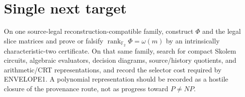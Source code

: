 \documentclass[11pt]{article}
\begin{document}
\section*{Single next target}
On one source-legal reconstruction-compatible family, construct \(\Phi\) and the legal slice
matrices and prove or falsify \(\operatorname{rank}_{\mathbb F_2}\Phi=\omega(m)\) by an
intrinsically characteristic-two certificate. On that same family, search for compact Skolem
circuits, algebraic evaluators, decision diagrams, source/history quotients, and
arithmetic/CRT representations, and record the selector cost required by ENVELOPE1. A
polynomial representation should be recorded as a hostile closure of the provenance route,
not as progress toward \(P\neq NP\).

\end{document}
